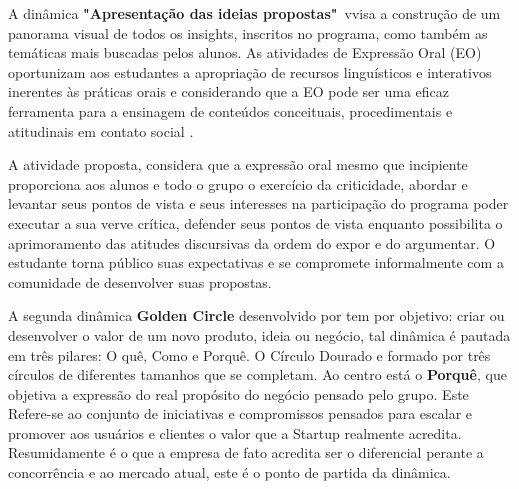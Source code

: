 A dinâmica \textbf{"Apresentação das ideias propostas"}\ vvisa a construção de um panorama visual de todos os insights, inscritos no programa, como também as temáticas mais buscadas pelos alunos. As atividades de Expressão Oral (EO) oportunizam aos estudantes a apropriação de recursos linguísticos e interativos inerentes às práticas orais e considerando que a EO pode ser uma eficaz ferramenta para a ensinagem de conteúdos conceituais, procedimentais e atitudinais em contato social \cite{baltar_genero_2010}.

A atividade proposta, considera que a expressão oral mesmo que incipiente proporciona aos alunos e todo o grupo o exercício da criticidade, abordar e levantar seus pontos de vista e seus interesses na participação do programa poder executar a sua verve crítica, defender seus pontos de vista enquanto possibilita o aprimoramento das atitudes discursivas da ordem do expor e do argumentar. O estudante torna público suas expectativas e se compromete informalmente com a comunidade de desenvolver suas propostas.

A segunda dinâmica \textbf{Golden Circle} desenvolvido por  tem por objetivo: criar ou desenvolver o valor de um novo produto, ideia ou negócio, tal dinâmica é pautada em três pilares: O quê, Como e Porquê. O Círculo Dourado e formado por três círculos de diferentes tamanhos que se completam. Ao centro está o \textbf{Porquê}, que objetiva a expressão do real propósito do negócio pensado pelo grupo. Este Refere-se ao conjunto de iniciativas e compromissos pensados para escalar e promover aos usuários e clientes o valor que a Startup realmente acredita. Resumidamente é o que a empresa de fato acredita ser o  diferencial perante a concorrência e ao mercado atual, este é o ponto de partida da dinâmica.


